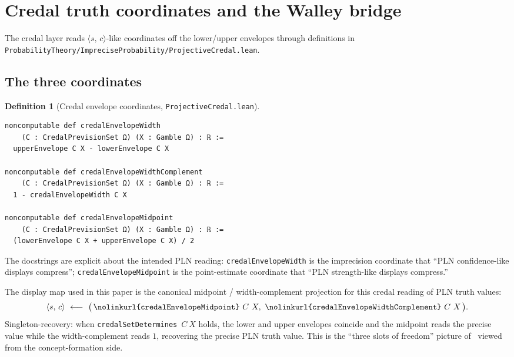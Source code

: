 \documentclass[]{article}
\newtheorem{definition}[theorem]{Definition}
\newcommand{\lid}[1]{{\ttfamily\nolinkurl{#1}}}
\newcommand{\lpath}[1]{\texttt{\nolinkurl{#1}}}
\newcommand{\STV}[2]{\langle #1,\, #2 \rangle}
\begin{document}
\section{Credal truth coordinates and the Walley bridge}\label{sec:walley}

The credal layer reads $\STV{s}{c}$-like coordinates off the lower/upper envelopes
through definitions in \lpath{ProbabilityTheory/ImpreciseProbability/ProjectiveCredal.lean}.

\subsection{The three coordinates}

\begin{definition}[Credal envelope coordinates,
\lpath{ProjectiveCredal.lean}]\label{def:coords}
\begin{lstlisting}
noncomputable def credalEnvelopeWidth
    (C : CredalPrevisionSet Ω) (X : Gamble Ω) : ℝ :=
  upperEnvelope C X - lowerEnvelope C X

noncomputable def credalEnvelopeWidthComplement
    (C : CredalPrevisionSet Ω) (X : Gamble Ω) : ℝ :=
  1 - credalEnvelopeWidth C X

noncomputable def credalEnvelopeMidpoint
    (C : CredalPrevisionSet Ω) (X : Gamble Ω) : ℝ :=
  (lowerEnvelope C X + upperEnvelope C X) / 2
\end{lstlisting}
\end{definition}

\noindent The docstrings are explicit about the intended PLN reading:
\lid{credalEnvelopeWidth} is the imprecision coordinate that
``PLN confidence-like displays compress'';
\lid{credalEnvelopeMidpoint} is the point-estimate coordinate that
``PLN strength-like displays compress.''

The display map used in this paper is the canonical midpoint /
width-complement projection for this credal reading of PLN truth values:
\[
  \STV{s}{c}\ \longleftarrow\
  \bigl(\,\text{\lid{credalEnvelopeMidpoint}}\ C\ X,\
        \text{\lid{credalEnvelopeWidthComplement}}\ C\ X\,\bigr).
\]
Singleton-recovery: when \lid{credalSetDetermines}\ $C\ X$ holds, the lower and upper
envelopes coincide and the midpoint reads the precise value while the
width-complement reads $1$, recovering the precise PLN truth value. This is the
``three slots of freedom'' picture of~\cite{pln-credal-degrees-of-freedom} viewed
from the concept-formation side.
\end{document}
